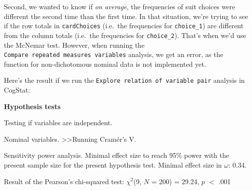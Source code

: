 \documentclass[
  11pt,
  a4paper,
  twoside,symmetric,openright]{book}
\theoremstyle{break}
\theoremstyle{break}
\begin{document}
Second, we wanted to know if \emph{on average}, the frequencies of suit choices were different the second time than the first time. In that situation, we're trying to see if the row totals in \texttt{cardChoices} (i.e.~the frequencies for \texttt{choice\_1}) are different from the column totals (i.e.~the frequencies for \texttt{choice\_2}). That's when we'd use the McNemar test. However, when running the \texttt{Compare\ repeated\ measures\ variables} analysis, we get an error, as the function for non-dichotomous nominal data is not implemented yet.

Here's the result if we run the \texttt{Explore\ relation\ of\ variable\ pair} analysis in CogStat:

\begin{tcolorbox}[colback=white,
  colframe=lightgray,
  coltext=black,
  boxsep=4pt,
  boxrule=0.3pt,
  arc=0pt]
  {   \sffamily
      \color{CSblue}\textbf{Hypothesis tests}
      
      \color{CSgreen}Testing if variables are independent.
      
      Nominal variables.  \textgreater\textgreater  Running Cramér's V.
      
      \color{black}
      Sensitivity power analysis. Minimal effect size to reach 95\% power with the present sample size for the present hypothesis test. Minimal effect size in $\omega$: 0.34.
      
      Result of the Pearson's  chi-squared test: $\chi^2$(9, $N$ = 200) = 29.24, $p$ $<$ .001
      \normalfont
  }
\end{tcolorbox}
\end{document}
